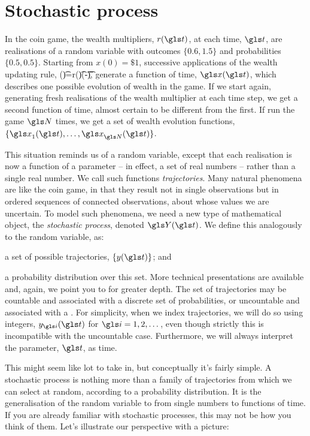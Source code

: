 \section{Stochastic process}
In the coin game, the wealth multipliers, $r(\t)$, at each time, $\t$, are realisations of a random variable with outcomes $\{0.6,1.5\}$ and probabilities $\{0.5,0.5\}$. Starting from $x(0)=\$1$, successive applications of the wealth updating rule,
\be
\x(\t)=r(\t)\x(\t-\d\t),
\ee
generate a function of time, $\x(\t)$, which describes one possible evolution of wealth in the game. If we start again, generating fresh realisations of the wealth multiplier at each time step, we get a second function of time, almost certain to be different from the first. If run the game $\N$ times, we get a set of wealth evolution functions, $\{\x_1(\t),\dots,\x_{\N}(\t)\}$.

This situation reminds us of a random variable, except that each realisation is now a function of a parameter -- in effect, a set of real numbers -- rather than a single real number. We call such functions \textit{trajectories}. Many natural phenomena are like the coin game, in that they result not in single observations but in ordered sequences of connected observations, about whose values we are uncertain. To model such phenomena, we need a new type of mathematical object, the \textit{stochastic process}, denoted $\Y(\t)$. We define this analogously to the random variable, as:
\bi
\item a set of possible trajectories, $\{y(\t)\}$; and
\item a probability distribution over this set.
\ei
More technical presentations are available and, again, we point you to \cite[p.~52]{vanKampen1992} for greater depth. The set of trajectories may be countable and associated with a discrete set of probabilities, or uncountable and associated with a \PDFa. For simplicity, when we index trajectories, we will do so using integers, $y_\gi(\t)$ for $\gi=1,2,\dots$, even though strictly this is incompatible with the uncountable case. Furthermore, we will always interpret the parameter, $\t$, as time.

This might seem like lot to take in, but conceptually it's fairly simple. A stochastic process is nothing more than a family of trajectories from which we can select at random, according to a probability distribution. It is the generalisation of the random variable to from single numbers to functions of time. If you are already familiar with stochastic processes, this may not be how you think of them. Let's illustrate our perspective with a picture:

